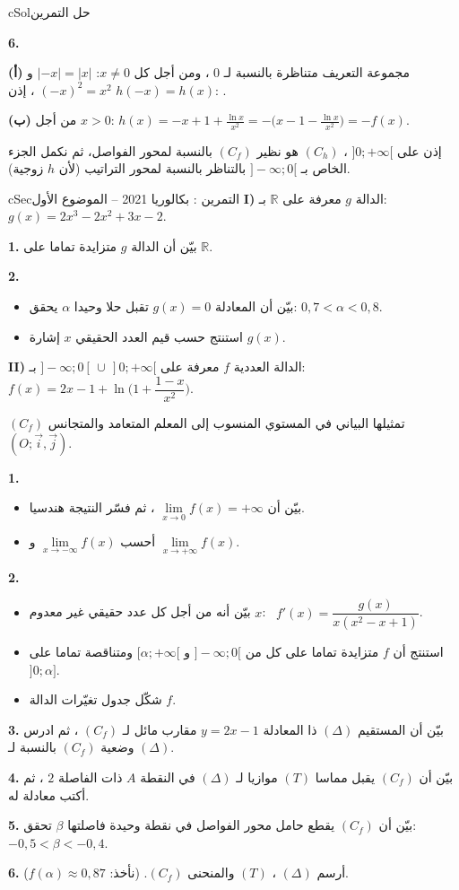 \documentclass[12pt,a4paper]{article}
\newenvironment{BOX}[2]{\begin{otherlanguage}{english}\begin{arbox}{#1}{#2}}{\end{arbox}\end{otherlanguage}}
\newcounter{exo}
\newenvironment{tamrin}[1]{\stepcounter{exo}\begin{BOX}{cSec}{التمرين \theexo: #1}}{\end{BOX}}
\newenvironment{hal}{\Needspace{12\baselineskip}\begin{otherlanguage}{english}\begin{arbox}[breakable]{cSol}{حل التمرين \theexo}}{\end{arbox}\end{otherlanguage}}
\newcommand{\ar}[1]{\foreignlanguage{arabic}{#1}}
\newcommand{\R}{\mathbb{R}}
\newenvironment{sq}{\begin{itemize}[leftmargin=2.4em,itemsep=3pt]}{\end{itemize}}
\newcommand{\qa}{\item[(أ)]}\newcommand{\qb}{\item[(ب)]}\newcommand{\qc}{\item[(جـ)]}\newcommand{\qd}{\item[(د)]}\newcommand{\qe}{\item[(هـ)]}
\newcommand{\pa}{\par\smallskip\textbf{(أ)} }\newcommand{\pb}{\par\smallskip\textbf{(ب)} }\newcommand{\pc}{\par\smallskip\textbf{(جـ)} }\newcommand{\pd}{\par\smallskip\textbf{(د)} }\newcommand{\pe}{\par\smallskip\textbf{(هـ)} }
\newcommand{\QQ}[1]{\par\smallskip\textbf{#1.} }
\newcommand{\bxt}[1]{\foreignlanguage{english}{\bxtbox{\ar{#1}}}}
\begin{document}
\begin{hal}
\QQ{6}
\pa مجموعة التعريف متناظرة بالنسبة لـ $0$ ، ومن أجل كل $x\neq0$: $|-x|=|x|$ و $(-x)^2=x^2$ ، إذن $h(-x)=h(x)$: \bxt{$h$ دالة زوجية}.

\pb من أجل $x>0$: $h(x)=-x+1+\frac{\ln x}{x^2}=-\Big(x-1-\frac{\ln x}{x^2}\Big)=-f(x)$.

إذن على $]0;+\infty[$ ، $(C_h)$ هو نظير $(C_f)$ بالنسبة لمحور الفواصل، ثم نكمل الجزء الخاص بـ $]-\infty;0[$ بالتناظر بالنسبة لمحور التراتيب (لأن $h$ زوجية).
\end{hal}

\begin{tamrin}{بكالوريا 2021 -- الموضوع الأول}
\textbf{I)} الدالة $g$ معرفة على $\R$ بـ: \ $g(x)=2x^3-2x^2+3x-2$.
\QQ{1} بيّن أن الدالة $g$ متزايدة تماما على $\R$.
\QQ{2}
\begin{sq}
\qa بيّن أن المعادلة $g(x)=0$ تقبل حلا وحيدا $\alpha$ يحقق: $0{,}7<\alpha<0{,}8$.
\qb استنتج حسب قيم العدد الحقيقي $x$ إشارة $g(x)$.
\end{sq}

\textbf{II)} الدالة العددية $f$ معرفة على $]-\infty;0[\,\cup\,]0;+\infty[$ بـ: \ $f(x)=2x-1+\ln\Big(1+\dfrac{1-x}{x^2}\Big)$.

$(C_f)$ تمثيلها البياني في المستوي المنسوب إلى المعلم المتعامد والمتجانس $(O;\vec i,\vec j)$.
\QQ{1}
\begin{sq}
\qa بيّن أن $\lim\limits_{x\to0}f(x)=+\infty$ ، ثم فسّر النتيجة هندسيا.
\qb أحسب $\lim\limits_{x\to-\infty}f(x)$ و $\lim\limits_{x\to+\infty}f(x)$.
\end{sq}
\QQ{2}
\begin{sq}
\qa بيّن أنه من أجل كل عدد حقيقي غير معدوم $x$: \ $f'(x)=\dfrac{g(x)}{x(x^2-x+1)}$.
\qb استنتج أن $f$ متزايدة تماما على كل من $]-\infty;0[$ و $[\alpha;+\infty[$ ومتناقصة تماما على $]0;\alpha]$.
\qc شكّل جدول تغيّرات الدالة $f$.
\end{sq}
\QQ{3} بيّن أن المستقيم $(\Delta)$ ذا المعادلة $y=2x-1$ مقارب مائل لـ $(C_f)$ ، ثم ادرس وضعية $(C_f)$ بالنسبة لـ $(\Delta)$.
\QQ{4} بيّن أن $(C_f)$ يقبل مماسا $(T)$ موازيا لـ $(\Delta)$ في النقطة $A$ ذات الفاصلة $2$ ، ثم أكتب معادلة له.
\QQ{5} بيّن أن $(C_f)$ يقطع حامل محور الفواصل في نقطة وحيدة فاصلتها $\beta$ تحقق: $-0{,}5<\beta<-0{,}4$.
\QQ{6} أرسم $(\Delta)$ ، $(T)$ والمنحنى $(C_f)$. (نأخذ: $f(\alpha)\approx0{,}87$).
\end{tamrin}
\end{document}
